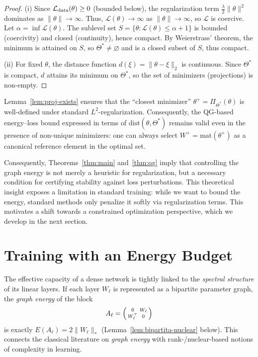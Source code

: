 \documentclass[a4paper,fleqn]{cas-sc}
\theoremstyle{remark}
\theoremstyle{definition}
\begin{document}
\begin{proof}
(i) Since $\mathcal{L}_{\rm data}(\theta)\ge 0$ (bounded below), the regularization term $\tfrac{\lambda}{2}\|\theta\|^2$ dominates as $\|\theta\|\to\infty$. Thus, $\mathcal{L}(\theta)\to\infty$ as $\|\theta\|\to\infty$, so $\mathcal{L}$ is coercive. Let $\alpha=\inf \mathcal{L}(\theta)$. The sublevel set $S=\{\theta:\mathcal{L}(\theta)\le \alpha+1\}$ is bounded (coercivity) and closed (continuity), hence compact. By Weierstrass' theorem, the minimum is attained on $S$, so $\Theta^*\neq\varnothing$ and is a closed subset of $S$, thus compact.

(ii) For fixed $\theta$, the distance function $d(\xi)=\|\theta-\xi\|_2$ is continuous. Since $\Theta^*$ is compact, $d$ attains its minimum on $\Theta^*$, so the set of minimizers (projections) is non-empty.
\end{proof}


Lemma~\ref{lem:proj-exists} ensures that the “closest minimizer” $\theta^+ = \Pi_{\Theta^*}(\theta)$ is well-defined under standard $L^2$-regularization. Consequently, the QG-based energy–loss bound expressed in terms of $\mathrm{dist}(\theta,\Theta^*)$ remains valid even in the presence of non-unique minimizers: one can always select $W^+ = \mathrm{mat}(\theta^+)$ as a canonical reference element in the optimal set.

Consequently, Theorems~\ref{thm:main} and~\ref{thm:qg} imply that controlling the graph energy is not merely a heuristic for regularization, but a necessary condition for certifying stability against loss perturbations. This theoretical insight exposes a limitation in standard training: while we want to bound the energy, standard methods only penalize it softly via regularization terms. This motivates a shift towards a constrained optimization perspective, which we develop in the next section.




\section{Training with an Energy Budget}
\label{sec:energy_budget}

The effective capacity of a dense network is tightly linked to the \emph{spectral structure} of its linear layers. If each layer $W_\ell$ is represented as a bipartite parameter graph, the \emph{graph energy} of the block
\[
A_\ell = \begin{psmallmatrix} 0 & W_\ell\\ W_\ell^\top & 0\end{psmallmatrix}
\]
is exactly $E(A_\ell)=2\|W_\ell\|_\ast$ (Lemma~\ref{lem:bipartita-nuclear} below). This connects the classical literature on \emph{graph energy} \cite{Gutman2012,GutmanZhou2012} with rank-/nuclear-based notions of complexity in learning.
\end{document}
